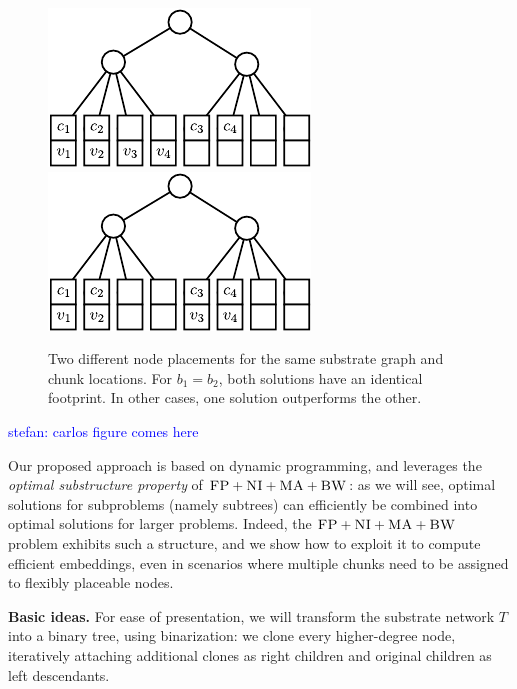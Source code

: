 \documentclass[9pt]{sigcomm-alternate}
\newcommand{\maciek}[1]{\textcolor{brown}{maciek: #1}}
\newcommand{\stefan}[1]{\textcolor{blue}{stefan: #1}}
\newcommand{\CC}{\textsc{NI}}
\newcommand{\FP}{\textsc{FP}}
\newcommand{\BW}{\textsc{BW}}
\newcommand{\MA}{\textsc{MA}}
\newcommand{\Tree}{\ensuremath{T}}
\newcommand{\CostTrans}{\ensuremath{b_1}}
\newcommand{\CostCom}{\ensuremath{b_2}}
\begin{document}
\begin{figure}
\includegraphics[width = 0.49\columnwidth]{figs/dynamic_good}
\hfill
\includegraphics[width = 0.49\columnwidth]{figs/dynamic_bad}
\caption{Two different node placements for the same substrate graph and chunk
locations. For $\CostTrans = \CostCom$, both solutions have an identical
footprint. In other cases, one solution outperforms the other.}
\label{fig:dynamic_motivation}
\end{figure}

\stefan{carlos figure comes here}


Our proposed approach is based on dynamic programming, and
leverages the \emph{optimal substructure property} of $\FP+\CC+\MA+\BW$:
as we will see, optimal solutions for subproblems (namely subtrees)
can efficiently be combined into optimal solutions for larger problems.
Indeed, the $\FP+\CC+\MA+\BW$ problem
exhibits such a structure, and we show how to exploit it to
compute efficient embeddings, even in scenarios where multiple chunks
need to be assigned to flexibly placeable nodes.

\textbf{Basic ideas.} For ease of presentation, we will transform the substrate network $\Tree$
into a binary tree, using binarization:
we clone every higher-degree node,
iteratively attaching additional clones as right children
and original children as left descendants.
\end{document}
